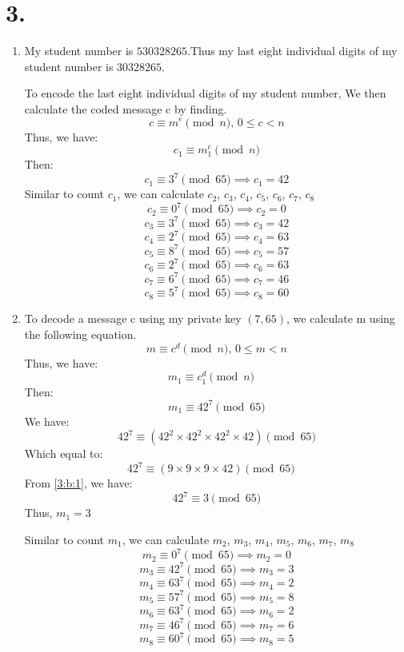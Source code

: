 \documentclass{article}
\begin{document}
	\section*{3. }
	\begin{enumerate}[label=({\alph*})]
		\item My student number is \(530328265\).Thus my last eight individual digits of my student number is \(30328265\).
		
		To encode the last eight individual digits of my student number, We then calculate the coded message c by finding.
		\[c \equiv m^e \pmod{n} \text{, } 0 \leq c < n \]
		Thus, we have:
		\[c_{1} \equiv m_{1}^e \pmod{n}\]
		Then:
		\[c_{1} \equiv 3^7 \pmod{65} \implies c_{1} = 42\]
		Similar to count \(c_{1}\), we can calculate \(c_{2}\), \(c_{3}\), \(c_{4}\), \(c_{5}\), \(c_{6}\), \(c_{7}\), \(c_{8}\)
		\[c_{2} \equiv 0^7 \pmod{65} \implies c_{2} = 0\]
		\[c_{3} \equiv 3^7 \pmod{65} \implies c_{3} = 42\]
		\[c_{4} \equiv 2^7 \pmod{65} \implies c_{4} = 63\]
		\[c_{5} \equiv 8^7 \pmod{65} \implies c_{5} = 57\]
		\[c_{6} \equiv 2^7 \pmod{65} \implies c_{6} = 63\]
		\[c_{7} \equiv 6^7 \pmod{65} \implies c_{7} = 46\]
		\[c_{8} \equiv 5^7 \pmod{65} \implies c_{8} = 60\]
		\item To decode a message c using my private key \((7, 65)\), we calculate m using the following equation.
		\[m \equiv c^d \pmod{n} \text{, } 0 \leq m < n\]
		Thus, we have:
		\begin{equation}
			m_{1} \equiv c_{1}^d \pmod{n} \quad \label{4:a:0}
		\end{equation}
		Then:
		\[m_{1} \equiv 42^7 \pmod{65}\]
		We have: 
		\[42 ^ 7 \equiv (42 ^ 2 \times 42 ^ 2 \times 42 ^ 2 \times 42) \pmod{65}\]
		Which equal to:
		\begin{equation}
			42 ^ 7 \equiv (9 \times 9 \times 9 \times 42) \pmod{65} \quad \label{3:b:1}
		\end{equation}
		From \eqref{3:b:1}, we have:
		\[42 ^ 7 \equiv 3 \pmod{65}\]
		Thus, \(m_{1} = 3\)

		Similar to count \(m_{1}\), we can calculate \(m_{2}\), \(m_{3}\), \(m_{4}\), \(m_{5}\), \(m_{6}\), \(m_{7}\), \(m_{8}\)
		\[m_{2} \equiv 0^7 \pmod{65} \implies m_{2} = 0\]
		\[m_{3} \equiv 42^7 \pmod{65} \implies m_{3} = 3\]
		\[m_{4} \equiv 63^7 \pmod{65} \implies m_{4} = 2\]
		\[m_{5} \equiv 57^7 \pmod{65} \implies m_{5} = 8\]
		\[m_{6} \equiv 63^7 \pmod{65} \implies m_{6} = 2\]
		\[m_{7} \equiv 46^7 \pmod{65} \implies m_{7} = 6\]
		\[m_{8} \equiv 60^7 \pmod{65} \implies m_{8} = 5\]
	\end{enumerate}
\end{document}
